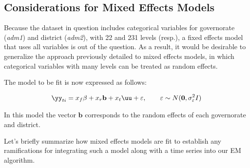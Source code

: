 \subsection{Considerations for Mixed Effects Models}

Because the dataset in question includes categorical variables for governorate (\emph{adm1}) and district (\emph{adm2}), with 22 and 231 levels (resp.), a fixed effects model that uses all variables is out of the question. As a result, it would be desirable to generalize the approach previously detailed to mixed effects models, in which categorical variables with many levels can be treated as random effects.

The model to be fit is now expressed as follows:

\begin{equation}
    \label{eq:mixed_effects_ts}
    \yy_{ti} = x_f\beta + x_r\mathbf{b} + x_t\uu + \varepsilon, \qquad \varepsilon \sim N(\mathbf{0},\sigma_\varepsilon^2I)
\end{equation}

In this model the vector $\mathbf{b}$ corresponds to the random effects of each governorate and district. 

Let's briefly summarize how mixed effects models are fit to establish any ramifications for integrating such a model along with a time series into our EM algorithm.